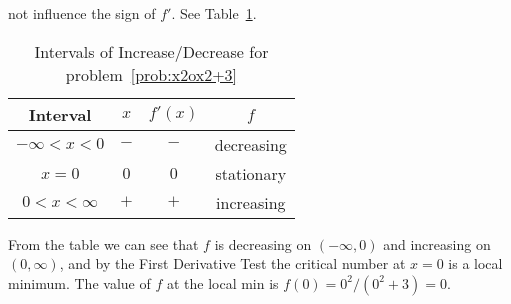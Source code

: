\documentclass{article}
\begin{document}
\begin{enumerate}
\begin{enumerate}
    not influence the sign of $f'$.  See Table~\ref{tab:x2ox2+3fp}.
    \begin{table}[htbp]
      \centering
      \begin{tabular}{|c|c|c|c|}
        \hline
        Interval         & $x$ & $f'(x)$ & $f$
        \\
        \hline\hline
        $-\infty<x<0$    & $-$ & $-$     & decreasing
        \\
        \hline
        $x=0$            & $0$ & $0$     & stationary
        \\
        \hline
        $0<x<\infty$     & $+$ & $+$     & increasing
        \\
        \hline
      \end{tabular}
      \caption{Intervals of Increase/Decrease for problem~\ref{prob:x2ox2+3}}
      \label{tab:x2ox2+3fp}
    \end{table}
    From the table we can see that $f$ is decreasing on $(-\infty,0)$
    and increasing on $(0,\infty)$, and by the First Derivative Test
    the critical number at $x=0$ is a local minimum.  The value of $f$
    at the local min is $f(0)=0^2/(0^2+3)=0$.


\end{enumerate}
\end{enumerate}
\end{document}
